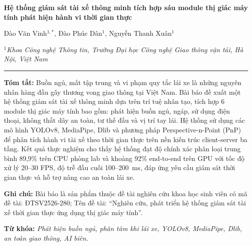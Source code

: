 \documentclass[10pt]{article}
\begin{document}
\begin{minipage}[c]{0.63\textwidth}
  \setlength{\parindent}{0pt}%
  {\raggedright
  {\fontsize{13}{16}\selectfont\bfseries Hệ thống giám sát tài xế thông minh tích hợp sáu module thị giác máy tính phát hiện hành vi thời gian thực}\par
  \vspace{12pt}
  {\fontsize{10}{12}\selectfont Đào Văn Vinh$^{1,\ast}$, Đào Phúc Dân$^{1}$, Nguyễn Thanh Xuân$^{1}$}\par
  \vspace{2pt}
  {\fontsize{10}{12}\selectfont\itshape $^{1}$Khoa Công nghệ Thông tin, Trường Đại học Công nghệ Giao thông vận tải, Hà Nội, Việt Nam}\par
  }
  \vspace{8pt}
  \noindent\rule{\linewidth}{0.4pt}\vspace{12pt}

  {\justifying\noindent\fontsize{10}{12}\selectfont\textbf{Tóm tắt:} Buồn ngủ, mất tập trung và vi phạm quy tắc lái xe là những nguyên nhân hàng đầu gây thương vong giao thông tại Việt Nam. Bài báo đề xuất một hệ thống giám sát tài xế thông minh dựa trên trí tuệ nhân tạo, tích hợp 6 module thị giác máy tính bao gồm: phát hiện buồn ngủ, ngáp, sử dụng điện thoại, không thắt dây an toàn, tư thế đầu và vị trí tay lái. Hệ thống sử dụng các mô hình YOLOv8, MediaPipe, Dlib và phương pháp Perspective-n-Point (PnP) để phân tích hành vi tài xế theo thời gian thực trên nền kiến trúc client-server ba tầng. Kết quả thực nghiệm cho thấy hệ thống đạt độ chính xác phân loại trung bình 89{,}9\% trên CPU phòng lab và khoảng 92\% end-to-end trên GPU với tốc độ xử lý 20--30 FPS, độ trễ đầu cuối 100--200~ms, đáp ứng yêu cầu giám sát thời gian thực và hỗ trợ nâng cao an toàn lái xe.\par
  }
  \vspace{8pt}

  {\justifying\noindent\fontsize{10}{12}\selectfont\textbf{Ghi chú:} Bài báo là sản phẩm thuộc đề tài nghiên cứu khoa học sinh viên có mã đề tài: ĐTSV2526-280; Tên đề tài: ``Nghiên cứu, phát triển hệ thống giám sát tài xế thời gian thực ứng dụng thị giác máy tính''.\par
  }
  \vspace{8pt}

  {\justifying\noindent\fontsize{10}{12}\selectfont\textbf{Từ khóa:} \textit{Phát hiện buồn ngủ, phân tâm khi lái xe, YOLOv8, MediaPipe, Dlib, an toàn giao thông, AI biên.}\par
  }
\end{minipage}
\end{document}

